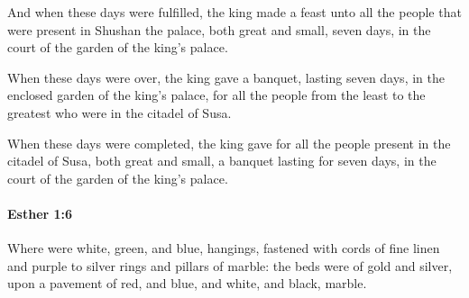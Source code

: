 			\begin{versebox}
					\item[BHS] 
					\item[LXX] 
					\item[ASV] And when these days were fulfilled, the king made a feast unto all the people that were present in Shushan the palace, both great and small, seven days, in the court of the garden of the king's palace.
					\item[NIV] When these days were over, the king gave a banquet, lasting seven days, in the enclosed garden of the king’s palace, for all the people from the least to the greatest who were in the citadel of Susa.
					\item[NRSV] When these days were completed, the king gave for all the people present in the citadel of Susa, both great and small, a banquet lasting for seven days, in the court of the garden of the king’s palace.
			\end{versebox}

		\paragraph{Esther 1:6} %
			\label{ESTHER-1-6}

			Where were white, green, and blue, hangings, fastened with cords of fine linen and purple to silver rings and pillars of marble: the beds were of gold and silver, upon a pavement of red, and blue, and white, and black, marble.

